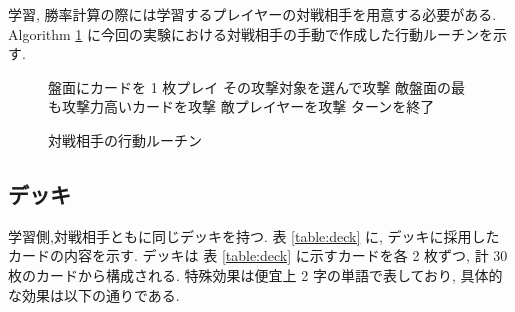\documentclass[twocolumn]{jarticle}
\begin{document}
学習, 勝率計算の際には学習するプレイヤーの対戦相手を用意する必要がある.
Algorithm \ref{alg1} に今回の実験における対戦相手の手動で作成した行動ルーチンを示す.
\begin{figure}[t]
  \vspace{-0.3cm}
  \begin{algorithm}[H]
    \small
      \caption{
        対戦相手の行動ルーチン
        }
      \label{alg1}
      \begin{algorithmic}[1] 
      \STATE 盤面にカードを 1 枚プレイ
      \STATE その攻撃対象を選んで攻撃
      \ELSE
      \STATE 敵盤面の最も攻撃力高いカードを攻撃
      \ELSE
      \STATE 敵プレイヤーを攻撃
      \ENDIF
      \ENDIF
      \ENDFOR
      \STATE ターンを終了
      \end{algorithmic}
  \end{algorithm}
  \vspace{-0.3cm}
  \end{figure}


\subsection{デッキ}
学習側,対戦相手ともに同じデッキを持つ.
表 \ref{table:deck} に, デッキに採用したカードの内容を示す. デッキは 表 \ref{table:deck} に示すカードを各 2 枚ずつ, 計 30 枚のカードから構成される. 
特殊効果は便宜上 2 字の単語で表しており, 具体的な効果は以下の通りである.
\end{document}
